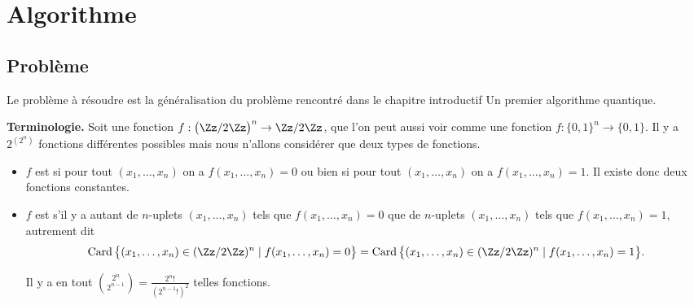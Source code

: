 \documentclass[11pt,class=report,crop=false]{standalone}
\begin{document}




\section{Algorithme}

\subsection{Problème}

Le problème à résoudre est la généralisation du problème rencontré dans le chapitre introductif \og{}Un premier algorithme quantique\fg{}.

\textbf{Terminologie.}
Soit une fonction $f : \big(\Zz/2\Zz\big)^n \to \Zz/2\Zz$, que l'on peut aussi voir comme une fonction $f : \{0,1\}^n \to \{0,1\}$. Il y a $2^{(2^n)}$ fonctions différentes possibles mais nous n'allons considérer que deux types de fonctions.
\begin{itemize}
  \item $f$ est  si pour tout $(x_1,\ldots,x_n)$ on a $f(x_1,\ldots,x_n)=0$
ou bien si pour tout $(x_1,\ldots,x_n)$ on a $f(x_1,\ldots,x_n)=1$. 
Il existe donc deux fonctions constantes.

  \item $f$ est  s'il y a autant de $n$-uplets $(x_1,\ldots,x_n)$ tels que $f(x_1,\ldots,x_n)=0$ que de $n$-uplets $(x_1,\ldots,x_n)$ tels que $f(x_1,\ldots,x_n)=1$, autrement dit 
$$\operatorname{Card}\big\{ (x_1,\ldots,x_n) \in (\Zz/2\Zz)^n \mid f(x_1,\ldots,x_n)=0 \big\}
= \operatorname{Card}\big\{ (x_1,\ldots,x_n) \in (\Zz/2\Zz)^n \mid f(x_1,\ldots,x_n)=1 \big\}.$$

Il y a en tout $\binom{2^n}{2^{n-1}} = \frac{2^n!}{(2^{n-1}!)^2}$ telles fonctions. 

\end{itemize}
\end{document}
